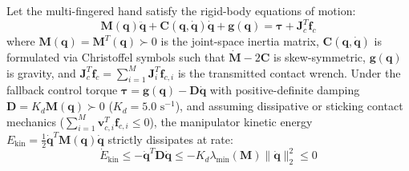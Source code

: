 \begin{proposition}
Let the multi-fingered hand satisfy the rigid-body equations of motion:
\begin{equation}
    \mathbf{M}(\mathbf{q}) \ddot{\mathbf{q}} + \mathbf{C}(\mathbf{q}, \dot{\mathbf{q}}) \dot{\mathbf{q}} + \mathbf{g}(\mathbf{q}) = \boldsymbol{\tau} + \mathbf{J}_c^T \mathbf{f}_c
    \label{eq:manipulator_eom}
\end{equation}
where $\mathbf{M}(\mathbf{q}) = \mathbf{M}^T(\mathbf{q}) \succ 0$ is the joint-space inertia matrix, $\mathbf{C}(\mathbf{q}, \dot{\mathbf{q}})$ is formulated via Christoffel symbols such that $\dot{\mathbf{M}} - 2\mathbf{C}$ is skew-symmetric, $\mathbf{g}(\mathbf{q})$ is gravity, and $\mathbf{J}_c^T \mathbf{f}_c = \sum_{i=1}^M \mathbf{J}_i^T \mathbf{f}_{c, i}$ is the transmitted contact wrench. Under the fallback control torque $\boldsymbol{\tau} = \mathbf{g}(\mathbf{q}) - \mathbf{D} \dot{\mathbf{q}}$ with positive-definite damping $\mathbf{D} = K_d \mathbf{M}(\mathbf{q}) \succ 0$ ($K_d = 5.0\text{ s}^{-1}$), and assuming dissipative or sticking contact mechanics ($\sum_{i=1}^M \mathbf{v}_{c, i}^T \mathbf{f}_{c, i} \le 0$), the manipulator kinetic energy $E_{\text{kin}} = \frac{1}{2} \dot{\mathbf{q}}^T \mathbf{M}(\mathbf{q}) \dot{\mathbf{q}}$ strictly dissipates at rate:
\begin{equation}
    \dot{E}_{\text{kin}} \le -\dot{\mathbf{q}}^T \mathbf{D} \dot{\mathbf{q}} \le -K_d \lambda_{\min}(\mathbf{M}) \|\dot{\mathbf{q}}\|_2^2 \le 0
\end{equation}
\end{proposition}
